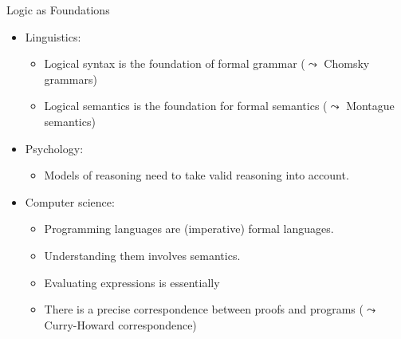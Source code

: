 \begin{frame}{Logic as Foundations}%

  \begin{itemize}
  \item Linguistics:
  \begin{itemize}
  \item Logical syntax is the foundation of formal grammar ($\leadsto$
    Chomsky grammars)
  \item Logical semantics is the foundation for formal semantics
    ($\leadsto$ Montague semantics)
  \end{itemize}
  \item Psychology:
    \begin{itemize}
    \item Models of reasoning need to take valid reasoning into
      account.
    \end{itemize}
    \item Computer science:
      \begin{itemize}
      \item Programming languages are (imperative) formal languages.
       \item Understanding them involves semantics.
         \item Evaluating expressions is essentially 
         \item There is a precise correspondence between proofs and
           programs ($\leadsto$ Curry-Howard correspondence) 
      \end{itemize}
  \end{itemize}
  
\end{frame}

